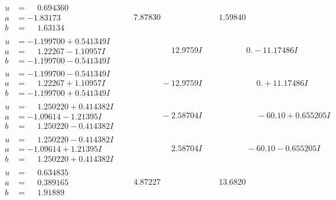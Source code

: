 \documentclass[1p]{elsarticle_modified}
\theoremstyle{definition}
\begin{document}
$$\begin{array}{c|c|c}
\begin{aligned}
u &= \phantom{-}0.694360\phantom{ +0.000000I} \\
a &= -1.83173\phantom{ +0.000000I} \\
b &= \phantom{-}1.63134\phantom{ +0.000000I}\end{aligned}
 & \phantom{-}7.87830\phantom{ +0.000000I} & \phantom{-}1.59840\phantom{ +0.000000I} \\ \hline\begin{aligned}
u &= -1.199700 + 0.541349 I \\
a &= \phantom{-}1.22267 - 1.10957 I \\
b &= -1.199700 - 0.541349 I\end{aligned}
 & \phantom{-0.000000 -}12.9759 I & \phantom{-0.000000 } 0. - 11.17486 I \\ \hline\begin{aligned}
u &= -1.199700 - 0.541349 I \\
a &= \phantom{-}1.22267 + 1.10957 I \\
b &= -1.199700 + 0.541349 I\end{aligned}
 & \phantom{-0.000000 } -12.9759 I & \phantom{-0.000000 -}0. + 11.17486 I \\ \hline\begin{aligned}
u &= \phantom{-}1.250220 + 0.414382 I \\
a &= -1.09614 - 1.21395 I \\
b &= \phantom{-}1.250220 - 0.414382 I\end{aligned}
 & \phantom{-0.000000 } -2.58704 I & \phantom{-0.000000 -}     -6
0. 10   + 0.655205 I \\ \hline\begin{aligned}
u &= \phantom{-}1.250220 - 0.414382 I \\
a &= -1.09614 + 1.21395 I \\
b &= \phantom{-}1.250220 + 0.414382 I\end{aligned}
 & \phantom{-0.000000 -}2.58704 I & \phantom{-0.000000 }      -6
0. 10   - 0.655205 I \\ \hline\begin{aligned}
u &= \phantom{-}0.634835\phantom{ +0.000000I} \\
a &= \phantom{-}0.389165\phantom{ +0.000000I} \\
b &= \phantom{-}1.91889\phantom{ +0.000000I}\end{aligned}
 & \phantom{-}4.87227\phantom{ +0.000000I} & \phantom{-}13.6820\phantom{ +0.000000I} \\ \hline\begin{aligned}

\end{aligned}
\end{array}$$
\end{document}
